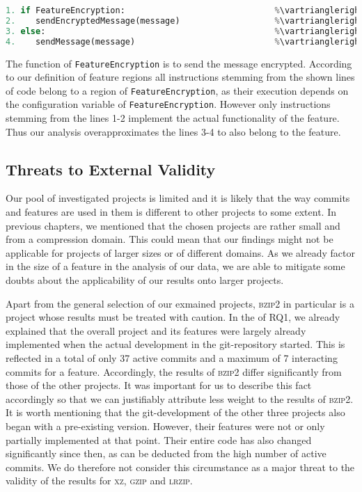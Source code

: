 \begin{lstlisting}[language=python, caption={Example for the Overapproximation of Feature Regions}, label={lst:feature_region_overapproximation}]
1. if FeatureEncryption:                              %\vartriangleright% %FeatureEncryption%
2.    sendEncryptedMessage(message)                   %\vartriangleright% %FeatureEncryption%
3. else:                                              %\vartriangleright% %FeatureEncryption%
4.    sendMessage(message)                            %\vartriangleright% %FeatureEncryption%
\end{lstlisting}
\label{lst:feature_region_overapproximation}
The function of \texttt{FeatureEncryption} is to send the message encrypted. According to our definition of feature regions all instructions stemming from the shown lines of code belong to a region of \texttt{FeatureEncryption}, as their execution depends on the configuration variable of \texttt{FeatureEncryption}. However only instructions stemming from the lines 1-2 implement the actual functionality of the feature. Thus our analysis overapproximates the lines 3-4 to also belong to the feature.

\subsection*{\textbf{Threats to External Validity}}

Our pool of investigated projects is limited and it is likely that the way commits and features are used in them is different to other projects to some extent.
In previous chapters, we mentioned that the chosen projects are rather small and from a compression domain.
This could mean that our findings might not be applicable for projects of larger sizes or of different domains.
As we already factor in the size of a feature in the analysis of our data, we are able to mitigate some doubts about the applicability of our results onto larger projects. 

Apart from the general selection of our exmained projects, \textsc{bzip2} in particular is a project whose results must be treated with caution.  
In the  of RQ1, we already explained that the overall project and its features were largely already implemented when the actual development in the git-repository started.
This is reflected in a total of only 37 active commits and a maximum of 7 interacting commits for a feature. 
Accordingly, the results of \textsc{bzip2} differ significantly from those of the other projects. 
It was important for us to describe this fact accordingly so that we can justifiably attribute less weight to the results of \textsc{bzip2}.  
It is worth mentioning that the git-development of the other three projects also began with a pre-existing version.  
However, their features were not or only partially implemented at that point.
Their entire code has also changed significantly since then, as can be deducted from the high number of active commits.
We do therefore not consider this circumstance as a major threat to the validity of the results for \textsc{xz}, \textsc{gzip} and \textsc{lrzip}. 
